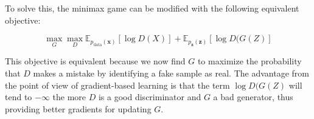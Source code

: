 \documentclass{article}
\begin{document}
To solve this, the minimax game can be modified with the following equivalent objective:

\begin{equation}
\max_G \max_D \mathbb{E}_{p_{\text{data}}(\mathbf{x})}[\log D(X)] + \mathbb{E}_{p_{\mathbf{z}}(\mathbf{z})}[\log D(G(Z)]
\end{equation}

This objective is equivalent because we now find $G$ to maximize the probability that $D$ makes a mistake by identifying a fake sample as real. The advantage from the point of view of gradient-based learning is that the term $\log D(G(Z)$ will tend to $-\infty$ the more $D$ is a good discriminator and $G$ a bad generator, thus providing better gradients for updating $G$.






























\end{document}
